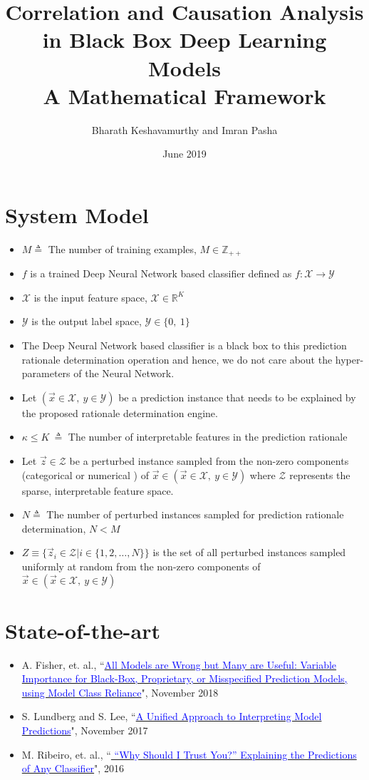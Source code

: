 \documentclass{article}
\title{%
      Correlation and Causation Analysis in Black Box Deep Learning Models \\
      \large A Mathematical Framework}
\author{Bharath Keshavamurthy and Imran Pasha}
\affil{CISCO Systems, Inc.}
\date{June 2019}
\begin{document}
\maketitle
\section{System Model}
\begin{itemize}
    \item $M \triangleq $ The number of training examples, $M \in \mathbb{Z}_{++}$
    \item $f$ is a trained Deep Neural Network based classifier defined as $f: \mathcal{X} \rightarrow \mathcal{Y}$
    \item $\mathcal{X}$ is the input feature space, $\mathcal{X} \in \mathbb{R}^{K}$
    \item $\mathcal{Y}$ is the output label space, $\mathcal{Y} \in \{0,\ 1\}$
    \item The Deep Neural Network based classifier is a black box to this prediction rationale determination operation and hence, we do not care about the hyper-parameters of the Neural Network.
    \item Let $(\vec{x} \in \mathcal{X},\ y \in \mathcal{Y})$ be a prediction instance that needs to be explained by the proposed rationale determination engine. 
    \item $\kappa \leq K\ \triangleq $ The number of interpretable features in the prediction rationale
    \item Let $\vec{z} \in \mathcal{Z}$ be a perturbed instance sampled from the non-zero components (categorical or numerical ) of $\vec{x} \in (\vec{x} \in \mathcal{X},\ y \in \mathcal{Y})$ where $\mathcal{Z}$ represents the sparse, interpretable feature space.
    \item $N \triangleq $ The number of perturbed instances sampled for prediction rationale determination, $N < M$
    \item $Z \equiv \{\vec{z}_i \in \mathcal{Z} | i \in \{1, 2, \dots, N\}\}$ is the set of all perturbed instances sampled uniformly at random from the non-zero components of \\ $\vec{x} \in (\vec{x} \in \mathcal{X},\ y \in \mathcal{Y})$
\end{itemize}
\section{State-of-the-art}
\begin{itemize}
    \item A. Fisher, et. al., ``\href{https://arxiv.org/pdf/1801.01489.pdf}{\textcolor{blue}{All Models are Wrong but Many are Useful: Variable Importance for Black-Box, Proprietary, or Misspecified Prediction Models, using Model Class Reliance}}", November 2018
    \item S. Lundberg and S. Lee, ``\href{https://arxiv.org/pdf/1705.07874.pdf}{\textcolor{blue}{A Unified Approach to Interpreting Model Predictions}}", November 2017
    \item M. Ribeiro, et. al., ``\href{https://www.kdd.org/kdd2016/papers/files/rfp0573-ribeiroA.pdf}{\textcolor{blue}{ “Why Should I Trust You?” Explaining the Predictions of Any Classifier}}", 2016
\end{itemize}
\end{document}
